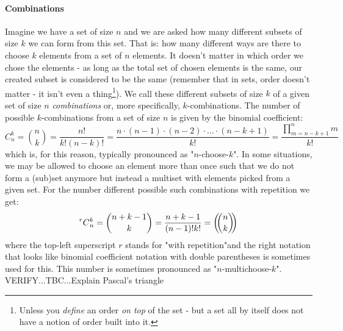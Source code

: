 

\paragraph{Combinations}
Imagine we have a set of size $n$ and we are asked how many different subsets of size $k$ we can form from this set. That is: how many different ways are there to choose $k$ elements from a set of $n$ elements. It doesn't matter in which order we chose the elements - as long as the total set of chosen elements is the same, our created subset is considered to be the same (remember that in sets, order doesn't matter - it isn't even a thing\footnote{Unless you \emph{define} an order \emph{on top} of the set - but a set all by itself does not have a notion of order built into it.}). We call these different subsets of size $k$ of a given set of size $n$ \emph{combinations} or, more specifically, $k$-combinations. The number of possible $k$-combinations from a set of size $n$ is given by the binomial coefficient:
\begin{equation}
C_n^k = \binom{n}{k} 
      = \frac{n!}{k! (n-k)!} 
      = \frac{n \cdot (n-1) \cdot (n-2) \cdot \ldots \cdot (n-k+1)}{k!}
      = \frac{\prod_{m=n-k+1}^{n} m}{k!}
\end{equation}
which is, for this reason, typically pronounced as "$n$-choose-$k$". In some situations, we may be allowed to choose an element more than once such that we do not form a (sub)set anymore but instead a multiset with elements picked from a given set. For the number different possible such combinations with repetition we get:
\begin{equation}
\prescript{r}{}{C}_n^k
= \binom{n+k-1}{k}
= \frac{n+k-1}{(n-1)! k!}
= \left(\!\!{n\choose k}\!\!\right)
\end{equation}
where the top-left superscript $r$ stands for "with repetition"and the right notation that looks like binomial coefficient notation with double parentheses is sometimes used for this. This number is sometimes pronounced as "$n$-multichoose-$k$". VERIFY...TBC...Explain Pascal's triangle


